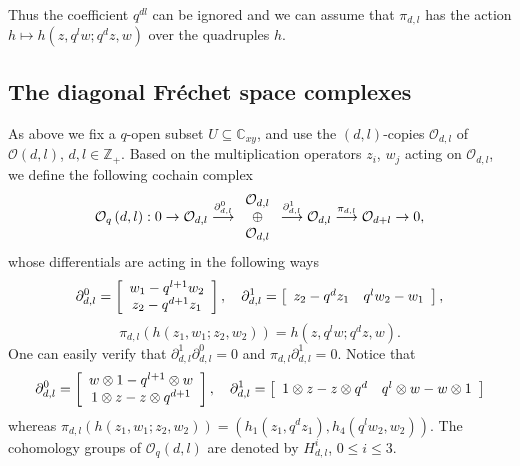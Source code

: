 \documentclass[12pt,reqno]{amsart}%
\theoremstyle{plain}
\numberwithin{theorem}{section} \numberwithin{equation}{section}
\numberwithin{lemma}{section}
\numberwithin{remark}{section}
\numberwithin{example}{section}
\numberwithin{proposition}{section}
\numberwithin{definition}{section}
\numberwithin{corollary}{section}
\begin{document}
Thus the coefficient $q^{dl}$ can be ignored and we can assume that $\pi
_{d,l}$ has the action $h\mapsto h\left(  z,q^{l}w;q^{d}z,w\right)  $ over the
quadruples $h$.

\subsection{The diagonal Fr\'{e}chet space complexes\label{subsecDFC1}}

As above we fix a $q$-open subset $U\subseteq\mathbb{C}_{xy}$, and use the
$\left(  d,l\right)  $-copies $\mathcal{O}_{d,l}$ of $\mathcal{O}\left(
d,l\right)  $, $d,l\in\mathbb{Z}_{+}$. Based on the multiplication operators
$z_{i}$, $w_{j}$ acting on $\mathcal{O}_{d,l}$, we define the following
cochain complex
\begin{equation}
\mathcal{O}_{q}\left(  d,l\right)  :0\rightarrow\mathcal{O}_{d,l}%
\overset{\partial_{d,l}^{0}}{\longrightarrow}%
\begin{array}
[c]{c}%
\mathcal{O}_{d,l}\\
\oplus\\
\mathcal{O}_{d,l}%
\end{array}
\overset{\partial_{d,l}^{1}}{\longrightarrow}\mathcal{O}_{d,l}\overset{\pi
_{d,l}}{\longrightarrow}\mathcal{O}_{d+l}\rightarrow0, \label{OqD}%
\end{equation}
whose differentials are acting in the following ways
\[
\partial_{d,l}^{0}=\left[
\begin{array}
[c]{c}%
w_{1}-q^{l+1}w_{2}\\
z_{2}-q^{d+1}z_{1}%
\end{array}
\right]  ,\quad\partial_{d,l}^{1}=\left[
\begin{array}
[c]{cc}%
z_{2}-q^{d}z_{1} & q^{l}w_{2}-w_{1}%
\end{array}
\right]  ,
\]%
\[
\pi_{d,l}\left(  h\left(  z_{1},w_{1};z_{2},w_{2}\right)  \right)  =h\left(
z,q^{l}w;q^{d}z,w\right)  .
\]
One can easily verify that $\partial_{d,l}^{1}\partial_{d,l}^{0}=0$ and
$\pi_{d,l}\partial_{d,l}^{1}=0$. Notice that
\[
\partial_{d,l}^{0}=\left[
\begin{array}
[c]{c}%
w\otimes1-q^{l+1}\otimes w\\
1\otimes z-z\otimes q^{d+1}%
\end{array}
\right]  ,\quad\partial_{d,l}^{1}=\left[
\begin{array}
[c]{cc}%
1\otimes z-z\otimes q^{d} & q^{l}\otimes w-w\otimes1
\end{array}
\right]
\]
whereas $\pi_{d,l}\left(  h\left(  z_{1},w_{1};z_{2},w_{2}\right)  \right)
=\left(  h_{1}\left(  z_{1},q^{d}z_{1}\right)  ,h_{4}\left(  q^{l}w_{2}%
,w_{2}\right)  \right)  $. The cohomology groups of $\mathcal{O}_{q}\left(
d,l\right)  $ are denoted by $H_{d,l}^{i}$, $0\leq i\leq3$.
\end{document}
